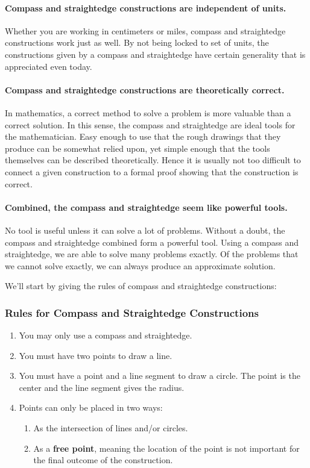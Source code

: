 \paragraph{Compass and straightedge constructions are \textbf{independent of units}.} 
Whether you are working in centimeters or miles, compass and
straightedge constructions work just as well. By not being locked to
set of units, the constructions given by a compass and straightedge
have certain generality that is appreciated even today.


\paragraph{Compass and straightedge constructions are \textbf{theoretically correct}.} 
In mathematics, a correct method to solve a problem is more valuable
than a correct solution. In this sense, the compass and straightedge
are ideal tools for the mathematician. Easy enough to use that the
rough drawings that they produce can be somewhat relied upon, yet
simple enough that the tools themselves can be described
theoretically. Hence it is usually not too difficult to connect a
given construction to a formal proof showing that the construction is
correct.


\paragraph{Combined, the compass and straightedge seem like \textbf{powerful tools}.} 
No tool is useful unless it can solve a lot of problems. Without a
doubt, the compass and straightedge combined form a powerful
tool. Using a compass and straightedge, we are able to solve many
problems exactly. Of the problems that we cannot solve exactly, we can
always produce an approximate solution.





 We'll start by giving the rules of compass and
straightedge constructions:

\subsubsection{Rules for Compass and Straightedge Constructions}
\begin{enumerate}
\item You may only use a compass and straightedge.
\item You must have two points to draw a line.
\item You must have a point and a line segment to draw a circle. The
  point is the center and the line segment gives the radius.
\item Points can only be placed in two ways:
\begin{enumerate}
\item As the intersection of lines and/or circles.
\item As a \textbf{free point}, meaning the location
  of the point is not important for the final outcome of the
  construction.
\end{enumerate}
\end{enumerate}

